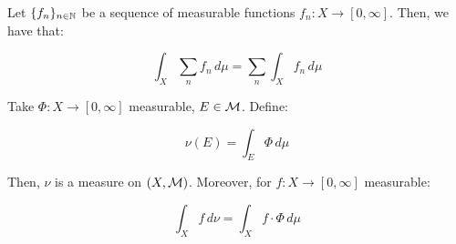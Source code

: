 \vspace{1em}

\begin{fcorollary}
    Let $\{f_n\}_{n \in \mathbb{N}}$ be a sequence of measurable functions $f_n: X \to [0, \infty]$.
    Then, we have that:

    $$\int_{X} \sum_{n} f_n \, d\mu = \sum_{n} \int_{X} f_n \, d\mu$$
    
\end{fcorollary}

\vspace{1em}

\begin{fproposition}
    Take $\Phi: X \to [0, \infty]$ measurable, $E \in \mathcal{M}$. Define:

    $$\nu(E) = \int_{E} \Phi \, d\mu$$

    Then, $\nu$ is a measure on $(X, \mathcal{M})$. Moreover, for $f: X \to [0, \infty]$ measurable:

    $$\int_{X} f \, d\nu = \int_{X} f \cdot \Phi \, d\mu$$

\end{fproposition}


